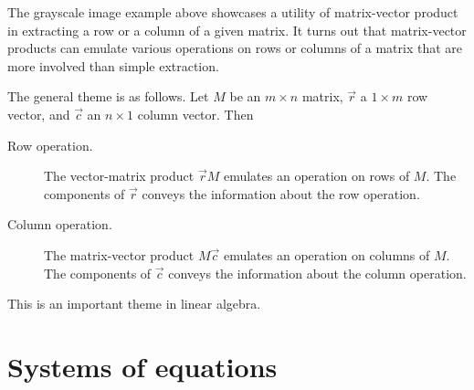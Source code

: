 \documentclass{ximera}
\begin{document}
\begin{concept}
  The grayscale image example above showcases a utility of
  matrix-vector product in extracting a row or a column of a given
  matrix. It turns out that matrix-vector products can emulate
  various operations on rows or columns of a matrix that are more
  involved than simple extraction.

  The general theme is as follows. Let $M$ be an $m \times n$ matrix,
  $\vec{r}$ a $1 \times m$ row vector, and $\vec{c}$ an $n \times 1$ column
  vector. Then
  \begin{description}
  \item[Row operation.] The vector-matrix product $\vec{r} M$ emulates an operation
    on rows of $M$. The components of $\vec{r}$ conveys the
    information about the row operation.
  \item[Column operation.] The matrix-vector product $M \vec{c}$
    emulates an operation on columns of $M$. The components of
    $\vec{c}$ conveys the information about the column operation.
  \end{description}
  This is an important theme in linear algebra.
\end{concept}


\section{Systems of equations}
\end{document}
